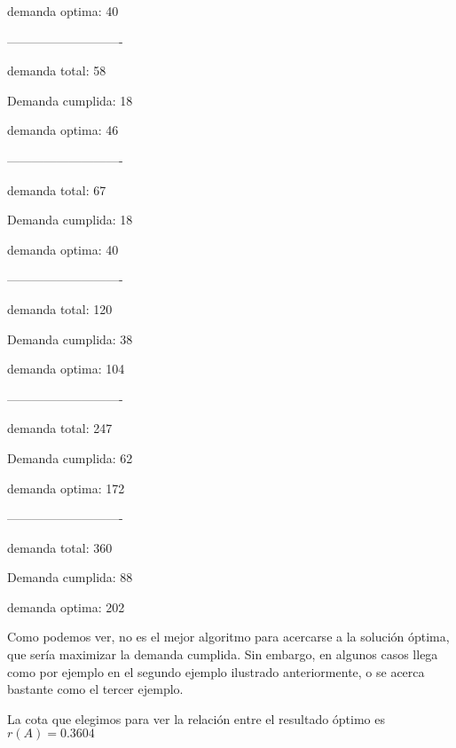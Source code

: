 demanda optima: 40

----------------------------

demanda total:  58

Demanda cumplida:  18

demanda optima: 46

----------------------------

demanda total:  67

Demanda cumplida:  18

demanda optima: 40

----------------------------

demanda total:  120

Demanda cumplida:  38

demanda optima: 104

----------------------------

demanda total:  247

Demanda cumplida:  62

demanda optima: 172

----------------------------

demanda total:  360

Demanda cumplida:  88

demanda optima: 202

Como podemos ver, no es el mejor algoritmo para acercarse a la solución óptima, que sería maximizar la demanda cumplida. Sin embargo, en algunos casos llega como por ejemplo en el segundo ejemplo ilustrado anteriormente, o se acerca bastante como el tercer ejemplo. 

La cota que elegimos para ver la relación entre el resultado óptimo es $r(A) = 0.3604$  

